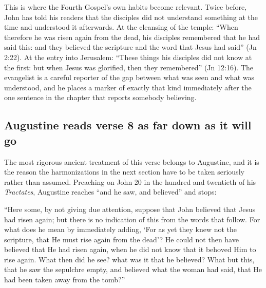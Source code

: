 This is where the Fourth Gospel's own habits become relevant. Twice before,
John has told his readers that the disciples did not understand something at
the time and understood it afterwards. At the cleansing of the temple: ``When
therefore he was risen again from the dead, his disciples remembered that he
had said this: and they believed the scripture and the word that Jesus had
said'' (Jn 2:22). At the entry into Jerusalem: ``These things his disciples did
not know at the first: but when Jesus was glorified, then they remembered''
(Jn 12:16). The evangelist is a careful reporter of the gap between what was
seen and what was understood, and he places a marker of exactly that kind
immediately after the one sentence in the chapter that reports somebody
believing.

\subsection{Augustine reads verse 8 as far down as it will go}

The most rigorous ancient treatment of this verse belongs to Augustine, and
it is the reason the harmonizations in the next section have to be taken
seriously rather than assumed. Preaching on John 20 in the hundred and
twentieth of his \emph{Tractates}, Augustine reaches ``and he saw, and
believed'' and stops:

\begin{studyframe}\small
``Here some, by not giving due attention, suppose that John believed that Jesus
had risen again; but there is no indication of this from the words that follow.
For what does he mean by immediately adding, `For as yet they knew not the
scripture, that He must rise again from the dead'? He could not then have
believed that He had risen again, when he did not know that it behoved Him to
rise again. What then did he see? what was it that he believed? What but this,
that he saw the sepulchre empty, and believed what the woman had said, that He
had been taken away from the tomb?''
\end{studyframe}

